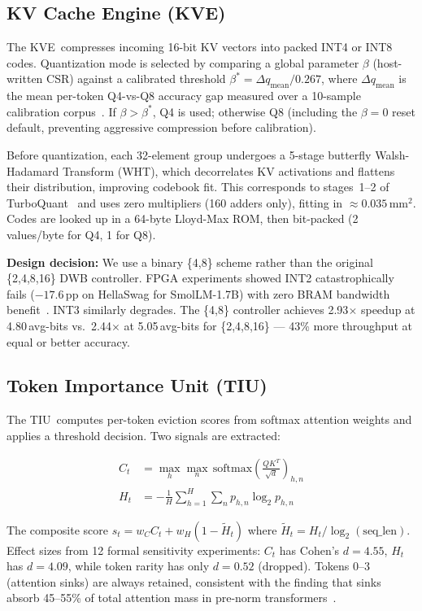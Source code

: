 \documentclass[conference]{IEEEtran}
\newcommand{\kve}{\textsc{KVE}}
\newcommand{\tiu}{\textsc{TIU}}
\begin{document}
\subsection{KV Cache Engine (\kve)}

The \kve\ compresses incoming 16-bit KV vectors into packed INT4 or
INT8 codes. Quantization mode is selected by comparing a global
parameter $\beta$ (host-written CSR) against a calibrated threshold
$\beta^* = \Delta q_\text{mean} / 0.267$, where $\Delta q_\text{mean}$
is the mean per-token Q4-vs-Q8 accuracy gap measured over a 10-sample
calibration corpus~\cite{dwb2026}. If $\beta > \beta^*$, Q4 is used;
otherwise Q8 (including the $\beta{=}0$ reset default, preventing
aggressive compression before calibration).

Before quantization, each 32-element group undergoes a 5-stage
butterfly Walsh-Hadamard Transform (WHT), which decorrelates KV
activations and flattens their distribution, improving codebook fit.
This corresponds to stages~1--2 of TurboQuant~\cite{turboquant2026}
and uses zero multipliers (160 adders only), fitting in
${\approx}0.035\,\text{mm}^2$. Codes are looked up in a 64-byte
Lloyd-Max ROM, then bit-packed (2 values/byte for Q4, 1 for Q8).

\textbf{Design decision:} We use a binary \{4,8\} scheme rather than
the original \{2,4,8,16\} DWB controller. FPGA experiments showed INT2
catastrophically fails ($-17.6$\,pp on HellaSwag for SmolLM-1.7B)
with zero BRAM bandwidth benefit~\cite{dwb2026}. INT3 similarly
degrades. The \{4,8\} controller achieves 2.93$\times$ speedup at
4.80\,avg-bits vs.\ 2.44$\times$ at 5.05\,avg-bits for \{2,4,8,16\}
--- 43\% more throughput at equal or better accuracy.

\subsection{Token Importance Unit (\tiu)}

The \tiu\ computes per-token eviction scores from softmax attention
weights and applies a threshold decision. Two signals are extracted:

\begin{align}
C_t &= \max_h \max_n \,\text{softmax}\!\left(\tfrac{QK^T}{\sqrt{d}}\right)_{h,n} \\
H_t &= -\tfrac{1}{H}\sum_{h=1}^{H}\sum_{n} p_{h,n}\log_2 p_{h,n}
\end{align}

The composite score $s_t = w_C C_t + w_H(1 - \tilde{H}_t)$ where
$\tilde{H}_t = H_t / \log_2(\text{seq\_len})$. Effect sizes from 12
formal sensitivity experiments: $C_t$ has Cohen's $d{=}4.55$, $H_t$
has $d{=}4.09$, while token rarity has only $d{=}0.52$ (dropped).
Tokens 0--3 (attention sinks) are always retained, consistent with the
finding that sinks absorb 45--55\% of total attention mass in pre-norm
transformers~\cite{streamingllm2023}.
\end{document}
